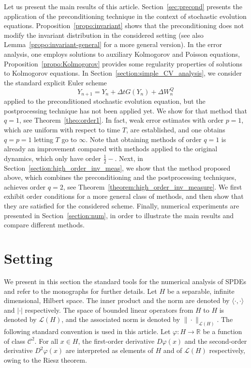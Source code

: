 \documentclass[11pt]{amsart}
\newcommand{\R}{\mathbb{R}}
\begin{document}
Let us present the main results of this article. Section~\ref{sec:precond} presents the application of the preconditioning technique in the context of stochastic evolution equations. Proposition~\ref{propo:invariant} shows that the preconditioning does not modify the invariant distribution in the considered setting (see also Lemma~\ref{propo:invariant-general} for a more general version). In the error analysis, one employs solutions to auxiliary Kolmogorov and Poisson equations, Proposition~\ref{propo:Kolmogorov} provides some regularity properties of solutions to Kolmogorov equations. In Section~\ref{section:simple_CV_analysis}, we consider the standard explicit Euler scheme
\[
Y_{n+1}=Y_n+\Delta tG(Y_n)+\Delta W_n^Q
\]
applied to the preconditioned stochastic evolution equation, but the postprocessing technique has not been applied yet. We show for that method that $q=1$, see Theorem~\ref{theo:order1}. In fact, weak error estimates with order $p=1$, which are uniform with respect to time $T$, are established, and one obtains $q=p=1$ letting $T$ go to $\infty$. Note that obtaining methods of order $q=1$ is already an improvement compared with methods applied to the original dynamics, which only have order $\frac{1}{2}-$. Next, in Section~\ref{section:high_order_inv_meas}, we show that the method proposed above, which combines the preconditioning and the postprocessing techniques, achieves order $q=2$, see Theorem~\ref{theorem:high_order_inv_measure}. We first exhibit order conditions for a more general class of methods, and then show that they are satisfied for the considered scheme. Finally, numerical experiments are presented in Section~\ref{section:num}, in order to illustrate the main results and compare different methods.


















\section{Setting}\label{sec:setting}

We present in this section the standard tools for the numerical analysis of SPDEs and refer to the monographs \cite{DPZ, JentzenKloeden:11, Kruse:14, Lord_Powell_Shardlow:14} for further details.
Let $H$ be a separable, infinite dimensional, Hilbert space.  The inner product and the norm are denoted by $\langle\cdot,\cdot\rangle$ and $|\cdot|$ respectively. The space of bounded linear operators from $H$ to $H$ is denoted by $\mathcal{L}(H)$, and the associated norm is denoted by $\|\cdot\|_{\mathcal{L}(H)}$.
%
The following standard convention is used in this article. Let $\varphi:H\to\R$ be a function of class $\mathcal{C}^2$. For all $x\in H$, the first-order derivative $D\varphi(x)$ and the second-order derivative $D^2\varphi(x)$ are interpreted as elements of $H$ and of $\mathcal{L}(H)$ respectively, owing to the Riesz theorem.
\end{document}
